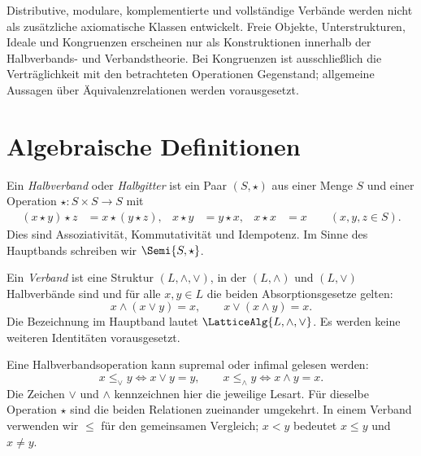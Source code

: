Distributive, modulare, komplementierte und vollständige Verbände
werden nicht als zusätzliche axiomatische Klassen entwickelt.
Freie Objekte, Unterstrukturen, Ideale und Kongruenzen erscheinen
nur als Konstruktionen innerhalb der Halbverbands- und Verbandstheorie.
Bei Kongruenzen ist ausschließlich die Verträglichkeit mit den
betrachteten Operationen Gegenstand; allgemeine Aussagen über
Äquivalenzrelationen werden vorausgesetzt.

\section{Algebraische Definitionen}

\begin{definition}[Halbverband]
\label{b45guide:def:semilattice}
Ein \emph{Halbverband} oder \emph{Halbgitter} ist ein Paar $(S,\star)$
aus einer Menge $S$ und einer Operation $\star:S\times S\to S$ mit
\[
\begin{aligned}
 (x\star y)\star z&=x\star(y\star z),&
 x\star y&=y\star x,& x\star x&=x
 \qquad(x,y,z\in S).
\end{aligned}
\]
Dies sind Assoziativität, Kommutativität und Idempotenz.
Im Sinne des Hauptbands schreiben wir $\Semi{S,\star}$.
\end{definition}

\begin{definition}[Verband]
\label{b45guide:def:lattice}
Ein \emph{Verband} ist eine Struktur $(L,\wedge,\vee)$,
in der $(L,\wedge)$ und $(L,\vee)$ Halbverbände sind und
für alle $x,y\in L$ die beiden Absorptionsgesetze gelten:
\[
 x\wedge(x\vee y)=x,\qquad x\vee(x\wedge y)=x.
\]
Die Bezeichnung im Hauptband lautet $\LatticeAlg{L,\wedge,\vee}$.
Es werden keine weiteren Identitäten vorausgesetzt.
\end{definition}

\begin{definition}
\label{b45guide:def:order}
Eine Halbverbandsoperation kann supremal oder infimal gelesen werden:
\[
 x\leq_{\vee}y\iff x\vee y=y,
 \qquad
 x\leq_{\wedge}y\iff x\wedge y=x.
\]
Die Zeichen $\vee$ und $\wedge$ kennzeichnen hier die jeweilige
Lesart. Für dieselbe Operation $\star$ sind die beiden Relationen
zueinander umgekehrt. In einem Verband verwenden wir $\leq$
für den gemeinsamen Vergleich; $x<y$ bedeutet $x\leq y$ und $x\ne y$.
\end{definition}

